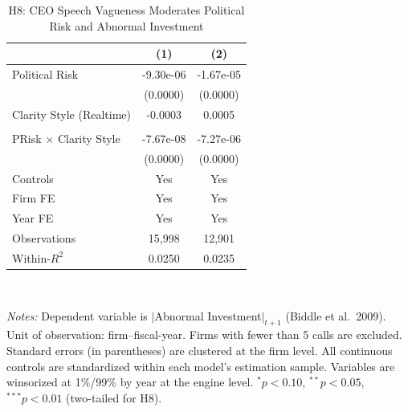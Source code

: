 \begin{table}[htbp]
\centering
\caption{H8: CEO Speech Vagueness Moderates Political Risk and Abnormal Investment}
\label{tab:h8_political_risk}
\small
\begin{tabular}{lcc}
\toprule
 & (1) & (2) \\
\midrule
Political Risk & -9.30e-06 & -1.67e-05 \\
 & (0.0000) & (0.0000) \\
Clarity Style (Realtime) & -0.0003 & 0.0005 \\
 &  &  \\
PRisk $\times$ Clarity Style & -7.67e-08 & -7.27e-06 \\
 & (0.0000) & (0.0000) \\
\midrule
Controls & Yes & Yes \\
Firm FE  & Yes & Yes \\
Year FE  & Yes & Yes \\
\midrule
Observations & 15,998 & 12,901 \\
Within-$R^2$ & 0.0250 & 0.0235 \\
\bottomrule
\end{tabular}
\\[-0.5em]
\parbox{\textwidth}{\scriptsize 
\textit{Notes:} Dependent variable is $|$Abnormal Investment$|_{t+1}$ (Biddle et al.\ 2009). Unit of observation: firm--fiscal-year. Firms with fewer than 5 calls are excluded. Standard errors (in parentheses) are clustered at the firm level. All continuous controls are standardized within each model's estimation sample. Variables are winsorized at 1\%/99\% by year at the engine level. $^{*}p<0.10$, $^{**}p<0.05$, $^{***}p<0.01$ (two-tailed for H8).
}
\end{table}